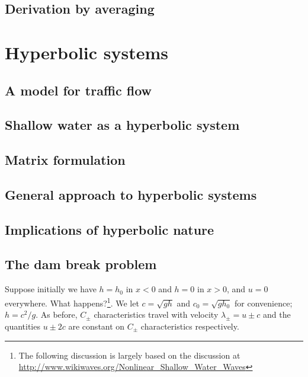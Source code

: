 \subsection{Derivation by averaging}

\section{Hyperbolic systems}
\subsection{A model for traffic flow}
\subsection{Shallow water as a hyperbolic system}
\subsection{Matrix formulation}
\subsection{General approach to hyperbolic systems}
\subsection{Implications of hyperbolic nature}
\clearpage
\subsection{The dam break problem}

Suppose initially we have $h = h_0$ in $x<0$ and $h=0$ in $x>0$, and $u=0$ everywhere. What happens?\footnote{The following discussion is largely based on the discussion at \url{http://www.wikiwaves.org/Nonlinear_Shallow_Water_Waves}}. We let $c = \sqrt{gh}$ and $c_0 = \sqrt{gh_0}$ for convenience; $h = c^2/g$. As before, $C_\pm$ characteristics travel with velocity $\lambda_\pm=u\pm c$ and the quantities $u\pm2c$ are constant on $C_\pm$ characteristics respectively. 

